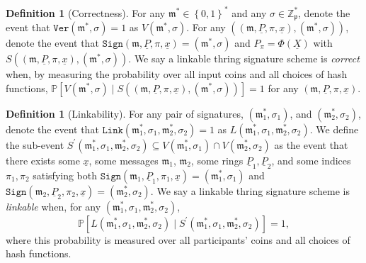 \documentclass{mrl}
\theoremstyle{definition}
\numberwithin{theorem}{subsection}
\newtheorem{defn}[theorem]{Definition}
\newcommand{\m}{\mathfrak{m}}
\begin{document}
\begin{defn}[Correctness]
For any $\m^* \in \left\{0,1\right\}^*$ and any $\sigma \in \mathbb{Z}_{\mathfrak{p}}^*$, denote the event that $\texttt{Ver}(\m^*, \sigma) = 1$ as $V(\m^*, \sigma)$. For any $((\m, \underline{P}, \pi, \underline{x}), (\m^*, \sigma))$, denote the event that $\texttt{Sign}(\m, \underline{P}, \pi, \underline{x}) = (\m^*, \sigma)$ and $P_\pi = \Phi(\underline{X})$ with $S\left((\m, \underline{P}, \pi, \underline{x}), (\m^*, \sigma)\right)$. We say a linkable thring signature scheme is \textit{correct} when, by measuring the probability over all input coins and all choices of hash functions, $\mathbb{P}\left[ V(\m^*, \sigma) \mid S\left((\m, \underline{P}, \pi, \underline{x}), (\m^*, \sigma)\right)\right] = 1$ for any $(\m, \underline{P}, \pi, \underline{x})$.
\end{defn}

\begin{defn}[Linkability]
For any pair of signatures, $(\m^*_1, \sigma_1)$, and $(\m^*_2, \sigma_2)$, denote the event that $\texttt{Link}(\m^*_1, \sigma_1, \m^*_2, \sigma_2) = 1$ as $L(\m^*_1, \sigma_1, \m^*_2, \sigma_2)$. We define the sub-event $S^{\prime}(\m^*_1, \sigma_1, \m^*_2, \sigma_2) \subseteq V(\m^*_1, \sigma_1) \cap V(\m^*_2, \sigma_2)$ as the event that there exists some $\underline{x}$, some messages $\m_1$, $\m_2$, some rings $\underline{P}_1, \underline{P}_2$, and some indices $\pi_1, \pi_2$ satisfying both  $\texttt{Sign}(\m_1, \underline{P}_1, \pi_1, \underline{x}) = (\m^*_1, \sigma_1)$ and $\texttt{Sign}(\m_2, \underline{P}_2, \pi_2, \underline{x}) = (\m^*_2, \sigma_2)$. We say a linkable thring signature scheme is \textit{linkable} when, for any $(\m^*_1, \sigma_1, \m^*_2, \sigma_2)$, \[\mathbb{P}\left[L(\m^*_1, \sigma_1, \m^*_2, \sigma_2)\mid S^{\prime}(\m^*_1, \sigma_1, \m^*_2, \sigma_2)\right] = 1,\] where this probability is measured over all participants' coins and all choices of hash functions.
\end{defn} 
\end{document}
